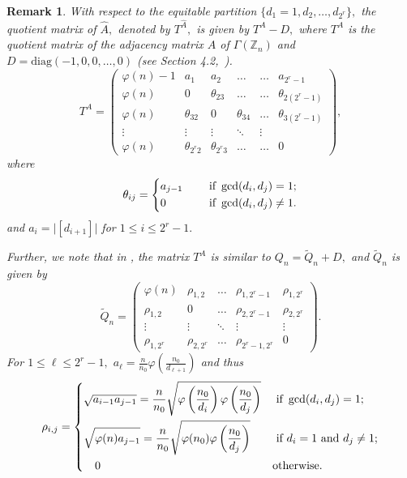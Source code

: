 \documentclass[11pt]{article}
\def \Z {{\mathbb Z}}
\newtheorem{rem}[theorem]{Remark}
\begin{document}
\begin{rem}
With respect to the equitable partition $\{d_1=1,d_2,\dots, d_{2^r}\},$ the quotient matrix of $\widehat A,$ denoted by $T^{\widehat A},$ is given by $T^A-D,$ where $T^A$ is the quotient matrix of the adjacency matrix $A$ of $\Gamma(\Z_n)$ and $D=\mathrm{diag}(-1,0,0,\dots, 0)$ (see Section 4.2,~\cite{Me}).
{$$T^A=\begin{pmatrix}
    \varphi(n)-1&a_1&a_2&\dots&\dots&a_{2^r-1}\\
    \varphi(n)&0&\theta_{23}&\dots&\dots&\theta_{2(2^r-1)}\\
    \varphi(n)&\theta_{32}&0&\theta_{34}&\dots&\theta_{3(2^r-1)}\\
    \vdots&\vdots&\vdots&\ddots&\vdots\\
    \varphi(n)&\theta_{2^r2}&\theta_{2^r3}&\dots&\dots&0
        \end{pmatrix},$$}
        where {\[ \theta_{ij}=\begin{dcases}
        a_{j-1}&\quad \text{ if } \gcd(d_i,d_j)=1;\\
        0 &\quad \text{ if } \gcd(d_i,d_j)\neq 1.
    \end{dcases}\]}
   and {$a_i=\Big|[d_{i+1}]\Big|$} for $1\leq i\leq 2^r-1.$

Further, we note that in \cite[Proposition 4.2.2]{Me}, the matrix $T^A$ is similar to $Q_n=\widetilde Q_n+D,$ and $\widetilde Q_n$ is given by 
$$\widetilde Q_n=\begin{pmatrix}
    \varphi(n)&\rho_{1,2}&\dots &\rho_{1,2^r-1}&\rho_{1,2^r}\\
    \rho_{1,2}&0&\dots&\rho_{2,2^r-1}&\rho_{2,2^r}\\
    \vdots&\vdots&\ddots&\vdots&\vdots\\
    \rho_{1,2^r}&\rho_{2,2^r}&\dots&\rho_{2^r-1,2^r}&0
\end{pmatrix}.$$
For $1\leq \ell\leq 2^r-1,$ $a_\ell=\frac{n}{n_0}\varphi\left(\frac{n_0}{d_{\ell+1}}\right)$ and thus $$\rho_{i,j}=\begin{dcases}
    \sqrt{a_{i-1}a_{j-1}}=\frac{n}{n_0}\sqrt{\varphi\left(\frac{n_0}{d_i}\right)\varphi\left(\frac{n_0}{d_j}\right)} & \text{ if } \gcd(d_i,d_j)=1;\\
    \sqrt{\varphi(n)a_{j-1}}=\frac{n}{n_0}\sqrt{\varphi(n_0)\varphi\left(\frac{n_0}{d_j}\right)}& \text{ if } d_i=1 \text{ and } d_j\neq 1;\\
    \quad 0& \text{otherwise}.
\end{dcases}$$
\end{rem}
\end{document}
